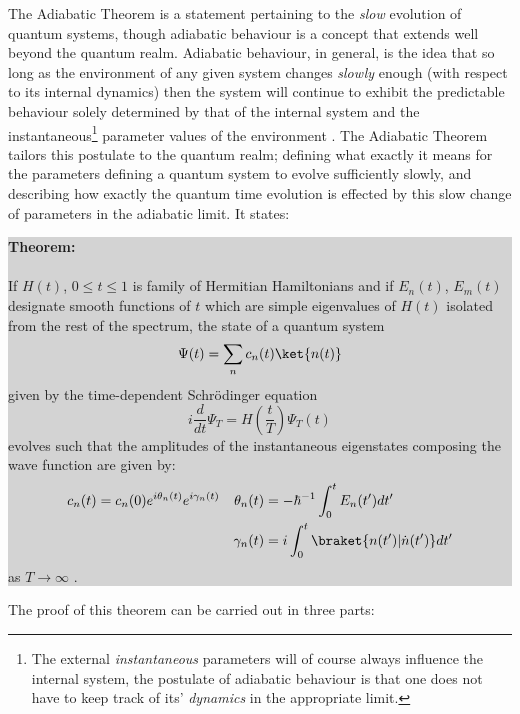 \documentclass{article}
\begin{document}
The Adiabatic Theorem is a statement pertaining to the \textit{slow} evolution of quantum systems, though adiabatic behaviour is a concept that extends well beyond the quantum realm. Adiabatic behaviour, in general, is the idea that so long as the environment of any given system changes \textit{slowly} enough (with respect to its internal dynamics) then the system will continue to exhibit the predictable behaviour solely determined by that of the internal system and the instantaneous\footnote{The external \textit{instantaneous} parameters will of course always influence the internal system, the postulate of adiabatic behaviour is that one does not have to keep track of its' \textit{dynamics} in the appropriate limit.} parameter values of the environment \cite{Griffiths2017}. The Adiabatic Theorem tailors this postulate to the quantum realm; defining what exactly it means for the parameters defining a quantum system to evolve sufficiently slowly, and describing how exactly the quantum time evolution is effected by this slow change of parameters in the adiabatic limit. It states:\\

\colorbox{lightgray}{
\begin{minipage}{0.9\textwidth}
\noindent\textbf{Theorem:}\\
\\
If $H(t)$, $0 \leq t \leq 1$ is  family of Hermitian Hamiltonians and if $E_n(t)$, $E_m(t)$ designate smooth functions of $t$ which are simple eigenvalues of $H(t)$ isolated from the rest of the spectrum, the state of a quantum system \[\Psi(t) = \sum_{n} c_{n}(t)\ket{n(t)}\] given by the time-dependent Schrödinger equation
  \[i\frac{d}{dt}\Psi_{T} = H(\frac{t}{T})\Psi_{T}(t)\]
evolves such that the amplitudes of the instantaneous eigenstates composing the wave function are given by:
    \begin{align*} 
        c_{n}(t) = c_{n}(0)e^{i\theta_{n}(t)}e^{i\gamma_{n}(t)} &&
        \theta_{n}(t)  &= -\hbar^{-1} \int_{0}^{t} E_{n}(t^{\prime}) dt^{\prime}\\  
        && \gamma_{n}(t) &= i\int_{0}^{t} \braket{n(t^{\prime})|\dot{n}(t^{\prime})}
        dt^{\prime}
    \end{align*}
as $T \to \infty$ \cite{Born1928, Berry1984, Simon1983, Sakurai1994}.
\end{minipage}
}

The proof of this theorem can be carried out in three parts:\\  
\end{document}
